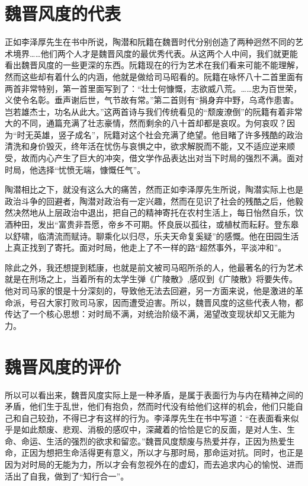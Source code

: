 \documentclass[12pt,a4paper]{ctexart}
\newcommand{\supercite}[1]{\textsuperscript{\cite{#1}}}
\begin{document}
\section{魏晋风度的代表}
正如李泽厚先生在书中所说，陶潜和阮籍在魏晋时代分别创造了两种迥然不同的艺术境界……他们两个人才是魏晋风度的最优秀代表。从这两个人中间，我们就更能看出魏晋风度的一些更深的东西。阮籍现在的行为艺术在我们看来可能不能理解，然而这些却有着什么的内涵，他就是做给司马昭看的。阮籍在咏怀八十二首里面有两首非常特别，第一首里面写到了：“壮士何慷慨，志欲威八荒。……忠为百世荣，义使令名彰。垂声谢后世，气节故有常。”第二首则有“捐身弃中野，乌鸢作患害。岂若雄杰士，功名从此大。”这两首诗与我们传统看见的“颓废潦倒”的阮籍有着非常大的不同，通篇充满了壮志豪情，然而剩余的八十首却都是哀叹。为何哀叹？因为“时无英雄，竖子成名”，阮籍对这个社会充满了绝望。他目睹了许多残酷的政治清洗和身价毁灭，终年活在忧伤与哀惧之中，欲求解脱而不能，又不适应逆来顺受，故而内心产生了巨大的冲突，借文学作品表达出对当下时局的强烈不满。面对时局，他选择“忧愤无端，慷慨任气”。

陶潜相比之下，就没有这么大的痛苦，然而正如李泽厚先生所说，陶潜实际上也是政治斗争的回避者，陶潜对政治有一定兴趣，然而在见识了社会的残酷之后，他毅然决然地从上层政治中退出，把自己的精神寄托在农村生活上，每日怡然自乐，饮酒种田，发出“富贵非吾愿，帝乡不可期。怀良辰以孤往，或植杖而耘耔。登东皋以舒啸，临清流而赋诗。聊乘化以归尽，乐夫天命复奚疑”的感慨。他在田园生活上真正找到了寄托。面对时局，他走上了不一样的路“超然事外，平淡冲和”。

除此之外，我还想提到嵇康，也就是前文被司马昭所杀的人，他最著名的行为艺术就是在刑场之上，当着所有的太学生弹《广陵散》,感叹到《广陵散》将要失传\supercite{6}。他对司马家的恨是十分深刻的，导致他无法去回避，另一方面来说，他是激进的革命派，号召大家打败司马家，因而遭受迫害。所以，魏晋风度的这些代表人物，都传达了一个核心思想：对时局不满，对统治阶级不满，渴望改变现状却又无能为力。
\section{魏晋风度的评价}
所以可以看出来，魏晋风度实际上是一种矛盾，是属于表面行为与内在精神之间的矛盾，他们生于乱世，他们有抱负，然而时代没有给他们这样的机会，他们只能自己和自己较劲，不得已才有这样的行为。李泽厚先生在书中写道：“在表面看来似乎是如此颓废、悲观、消极的感叹中，深藏着的恰恰是它的反面，是对人生、生命、命运、生活的强烈的欲求和留恋。”魏晋风度颓废与热爱并存，正因为热爱生命，正因为想把生命活得更有意义，所以才与那时局，那命运对抗。同时，也正是因为对时局的无能为力，所以才会有忽视外在的虚幻，而去追求内心的愉悦、进而活出了自我，做到了“知行合一”。
\end{document}
